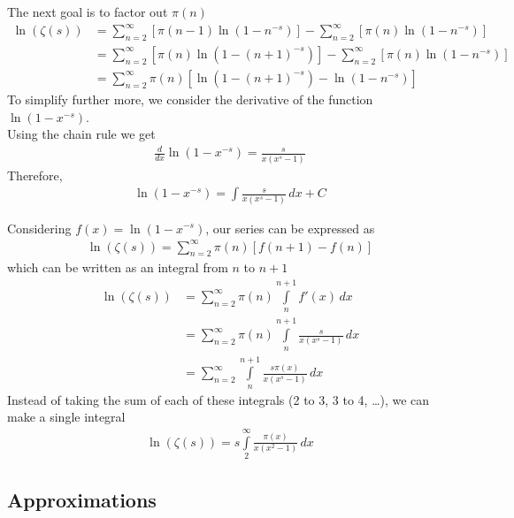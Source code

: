 \documentclass{article}
\begin{document}
The next goal is to factor out \(\pi (n)\)
\begin{align*}
    \ln\left(\zeta(s)\right)
    &=\sum_{n=2}^{\infty}\left[\pi (n-1)\ln\left(1-n^{-s}\right)\right]
    -\sum_{n=2}^{\infty}\left[\pi (n)\ln\left(1-n^{-s}\right)\right]
    \\&=\sum_{n=2}^{\infty}\left[\pi (n)\ln\left(1-{(n+1)}^{-s}\right)\right]
    -\sum_{n=2}^{\infty}\left[\pi (n)\ln\left(1-n^{-s}\right)\right]
    \\
    &=\sum_{n=2}^{\infty}\pi (n)\left[\ln\left(1-{(n+1)}^{-s}\right)-\ln\left(1-n^{-s}\right)\right]
\end{align*}
To simplify further more, we consider the derivative of the function \(\ln(1-x^{-s})\).
\\
Using the chain rule we get
\begin{align*}
    \frac{d}{dx}\ln\left(1-x^{-s}\right)=
    \frac{s}{x(x^s-1)}
\end{align*}
Therefore,
\begin{align*}
    \ln\left(1-x^{-s}\right)=
    \int \frac{s}{x(x^s-1)}\,dx+C
\end{align*}

Considering \(f(x)=\ln(1-x^{-s})\), our series can be expressed as
\begin{align*}
    \ln\left(\zeta(s)\right)=
    \sum_{n=2}^{\infty}\pi(n)\left[f(n+1)-f(n)\right]
\end{align*}
which can be written as an integral from \(n\) to \(n+1\)
\begin{align*}
    \ln\left(\zeta(s)\right)&=
    \sum_{n=2}^{\infty}\pi(n)
    \int\limits_n^{n+1} f'(x)\,dx
    \\
    &=
    \sum_{n=2}^{\infty}\pi(n)
    \int\limits_n^{n+1}
    \frac{s}{x(x^s-1)}\,dx
    \\
    &=
    \sum_{n=2}^{\infty}
    \int\limits_n^{n+1}
    \frac{s\pi(x)}{x(x^s-1)}\,dx
\end{align*}
Instead of taking the sum of each of these integrals (2 to 3, 3 to 4, \ldots), we can make a single integral
\begin{align*}
    \ln\left(\zeta(s)\right)=
    s\int\limits_2^\infty
    \frac{\pi(x)}{x(x^2-1)}\,dx
\end{align*}

\pagebreak

\subsection{Approximations}
\end{document}
